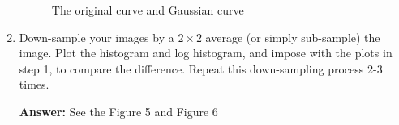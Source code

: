 \documentclass[11pt]{article}
\newcommand{\Answer}{\color{red}\textbf{Answer:} \color{black}}
\begin{document}
\begin{enumerate}
\begin{figure}[h]
{    }
    \caption{The original curve and Gaussian curve}
\end{figure}


\item Down-sample your images by a $2\times 2$ average (or simply sub-sample) the image. Plot the histogram and log histogram, and impose with the plots in step 1, to compare the difference. Repeat this down-sampling process 2-3 times. 

\Answer See the Figure 5 and Figure 6
\begin{figure}[h]
    \centering
\end{figure}
\end{enumerate}
\end{document}
